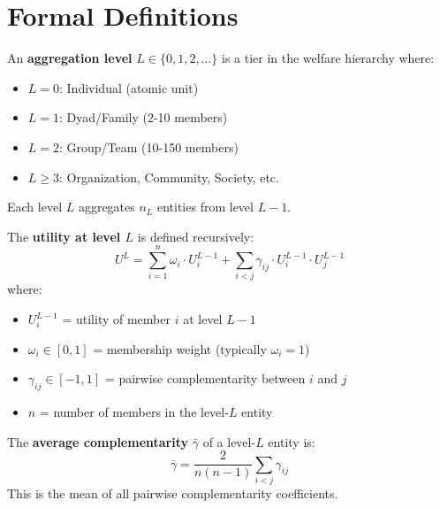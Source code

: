 \section{Formal Definitions}
\label{sec:let-definitions}

\begin{definition}
\label{def:level}
An \textbf{aggregation level} $L \in \{0, 1, 2, \ldots\}$ is a tier in the
welfare hierarchy where:
\begin{itemize}[nosep]
\item $L = 0$: Individual (atomic unit)
\item $L = 1$: Dyad/Family (2-10 members)
\item $L = 2$: Group/Team (10-150 members)
\item $L \geq 3$: Organization, Community, Society, etc.
\end{itemize}
Each level $L$ aggregates $n_L$ entities from level $L-1$.
\end{definition}

\begin{definition}
\label{def:level-utility}
The \textbf{utility at level $L$} is defined recursively:
\begin{equation}
U^L = \sum_{i=1}^{n} \omega_i \cdot U^{L-1}_i + \sum_{i<j} \gamma_{ij} \cdot U^{L-1}_i \cdot U^{L-1}_j
\label{eq:level-utility}
\end{equation}
where:
\begin{itemize}[nosep]
\item $U^{L-1}_i$ = utility of member $i$ at level $L-1$
\item $\omega_i \in [0,1]$ = membership weight (typically $\omega_i = 1$)
\item $\gamma_{ij} \in [-1, 1]$ = pairwise complementarity between $i$ and $j$
\item $n$ = number of members in the level-$L$ entity
\end{itemize}
\end{definition}

\begin{definition}
\label{def:avg-gamma}
The \textbf{average complementarity} $\bar{\gamma}$ of a level-$L$ entity is:
\begin{equation}
\bar{\gamma} = \frac{2}{n(n-1)} \sum_{i<j} \gamma_{ij}
\label{eq:avg-gamma}
\end{equation}
This is the mean of all pairwise complementarity coefficients.
\end{definition}

